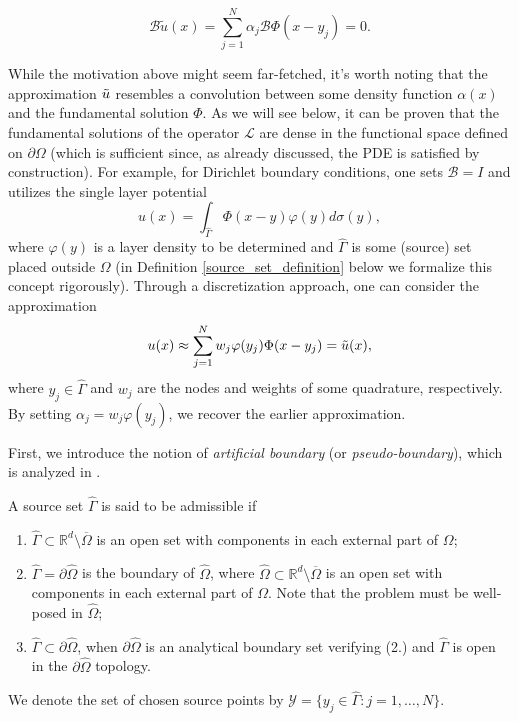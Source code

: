 \[
\mathcal{B}\tilde{u}(x) = \sum_{j=1}^{N}\alpha_j \mathcal{B}\Phi(x-y_j) = 0.
\]

\begin{remark}\label{chatp_numerical_remark_conv_motivation}
    While the motivation above might seem far-fetched, it's worth noting that the approximation $\Tilde{u}$ resembles a convolution between some density function $\alpha(x)$ and the fundamental solution $\Phi$. As we will see below, it can be proven that the fundamental solutions of the operator $\mathcal{L}$ are dense in the functional space defined on $\partial\Omega$ (which is sufficient since, as already discussed, the \ac{PDE} is satisfied by construction). For example, for Dirichlet boundary conditions, one sets $\mathcal{B} = I$ and utilizes the single layer potential
    \[
        u(x) = \int_{\hat{\Gamma}}\Phi(x-y)\varphi(y)d\sigma(y),
    \]
    where $\varphi(y)$ is a layer density to be determined and \(\hat{\Gamma}\) is some (source) set placed outside \(\Omega\) (in Definition \ref{source_set_definition} below we formalize this concept rigorously). Through a discretization approach, one can consider the approximation
    \begin{equation}\label{MFS_approx_disc}
    u(x) \approx \sum_{j=1}^{N}w_j \varphi(y_j) \Phi(x-y_j) = \Tilde{u}(x),
    \end{equation}
    where $y_j \in \hat{\Gamma}$ and $w_j$ are the nodes and weights of some quadrature, respectively. By setting $\alpha_j = w_j \varphi(y_j)$, we recover the earlier approximation.
    
\end{remark}
First, we introduce the notion of \textit{artificial boundary} (or \textit{pseudo-boundary}), which is analyzed in \cite{alves2009choice}.
\begin{definition}\label{source_set_definition}
    A source set \(\hat{\Gamma}\) is said to be admissible if
    \begin{enumerate}
        \item \(\hat{\Gamma} \subset \mathbb{R}^d\setminus \overline{\Omega}\) is an open set with components in each external part of \(\Omega\);
        \item \label{source_set_definition_2} \(\hat{\Gamma} = \partial \hat{\Omega}\) is the boundary of \(\hat{\Omega}\), where \(\hat{\Omega} \subset \mathbb{R}^d\setminus\overline{\Omega}\) is an open set with components in each external part of \(\Omega\). Note that the problem must be well-posed in \(\hat{\Omega}\);
        \item \(\hat{\Gamma} \subset \partial \hat{\Omega}\), when \(\partial \hat{\Omega}\) is an analytical boundary set verifying (2.) and \(\hat{\Gamma}\) is open in the \(\partial \hat{\Omega}\) topology. 
    \end{enumerate}
    We denote the set of chosen source points by \(\mathcal{Y} = \{y_j \in \hat{\Gamma}: j=1,\dots,N\}\).
\end{definition}
